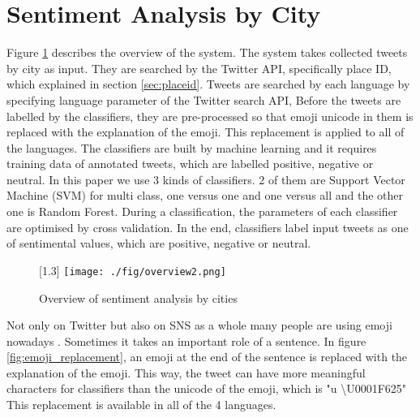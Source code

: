 \documentclass[twocolumn]{article}
\begin{document}
\vspace{-6mm}

\section{Sentiment Analysis by City}\label{sec:overview}
\vspace{-2mm}
Figure \ref{fig:overview} describes the overview of the system.
The system takes collected tweets by city as input.
They are searched by the Twitter API, specifically place ID, which explained in section \ref{sec:placeid}.
Tweets are searched by each language by specifying language parameter of the Twitter search API,
Before the tweets are labelled by the classifiers, they are pre-processed so that emoji unicode in them is replaced with the explanation of the emoji.
This replacement is applied to all of the languages.
The classifiers are built by machine learning and it requires training data of annotated tweets, which are labelled positive, negative or neutral.
In this paper we use 3 kinds of classifiers.
2 of them are Support Vector Machine (SVM) for multi class, one versus one and one versus all and the other one is Random Forest.
During a classification, the parameters of each classifier are optimised by cross validation.
In the end, classifiers label input tweets as one of sentimental values, which are positive, negative or neutral.

\begin{figure}
	\centering
	\scalebox{1.2}[1.3]{
	\texttt{[image: ./fig/overview2.png]}
	}
	\caption{Overview of sentiment analysis by cities}
	\label{fig:overview}
\end{figure}

Not only on Twitter but also on SNS as a whole many people are using emoji nowadays \cite{emoji}.
Sometimes it takes an important role of a sentence.
In figure \ref{fig:emoji_replacement}, an emoji at the end of the sentence is replaced with the explanation of the emoji.
This way, the tweet can have more meaningful characters for classifiers than the unicode of the emoji, which is "u \textbackslash U0001F625"
This replacement is available in all of the 4 languages.
\end{document}
